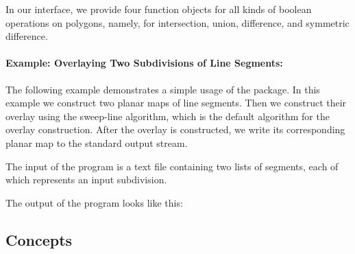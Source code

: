 \begin{ccTexOnly}
In our interface, we provide four function objects 
for all kinds of boolean operations on polygons,
namely, for intersection, union, difference, and 
symmetric difference.


\paragraph*{Example: Overlaying Two Subdivisions of Line Segments:}
The following example demonstrates a simple usage of the 
 package.
In this example we construct two planar maps of line segments. 
Then we construct their overlay using the sweep-line algorithm, which is 
the default algorithm for the overlay construction. 
After the overlay is constructed, we write its corresponding planar map to the 
standard output stream. 

The input of the program is a text file containing two lists of segments, 
each of which represents an input subdivision.

The output of the program looks like this:


\subsection*{Concepts}
\\
\\
\\
\\
\\
\\
\\


\end{ccTexOnly}
